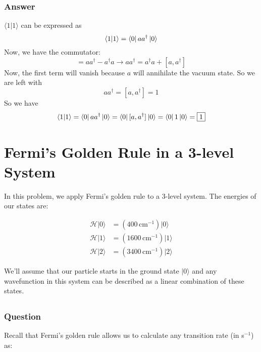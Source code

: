 \documentclass[12pt]{article}
\begin{document}
\subsubsection{Answer}
$\langle 1|1 \rangle$ can be expressed as
\begin{equation}
    \langle 1|1 \rangle = \bra{0}aa^{\dagger}\ket{0}
\end{equation}
Now, we have the commutator:
\begin{equation}
    [a, a^{\dagger}] = aa^{\dagger} - a^{\dagger}a \rightarrow aa^{\dagger} = a^{\dagger}a + [a, a^{\dagger}]
\end{equation}
Now, the first term will vanish because $a$ will annihilate the vacuum state. So we are left with
\begin{equation}
    aa^{\dagger} = [a, a^{\dagger}] = 1
\end{equation}
So we have
\begin{equation}
    \langle 1|1 \rangle = \bra{0}aa^{\dagger}\ket{0} = \bra{0}[a, a^{\dagger}]\ket{0} = \bra{0}1\ket{0} = \boxed{1}
\end{equation}
\section{Fermi’s Golden Rule in a 3-level System}



In this problem, we apply Fermi’s golden rule to a 3-level system. The energies of our states are:

\begin{align}
\mathcal{H}|0\rangle &= (400 \, \text{cm}^{-1})|0\rangle \\
\mathcal{H}|1\rangle &= (1600 \, \text{cm}^{-1})|1\rangle \\
\mathcal{H}|2\rangle &= (3400 \, \text{cm}^{-1})|2\rangle 
\end{align}

We’ll assume that our particle starts in the ground state \(|0\rangle\) and any wavefunction in this system can be described as a linear combination of these states.

\subsection{}
\subsubsection{Question}

Recall that Fermi’s golden rule allows us to calculate any transition rate (in s\(^{-1}\)) as:
\end{document}
